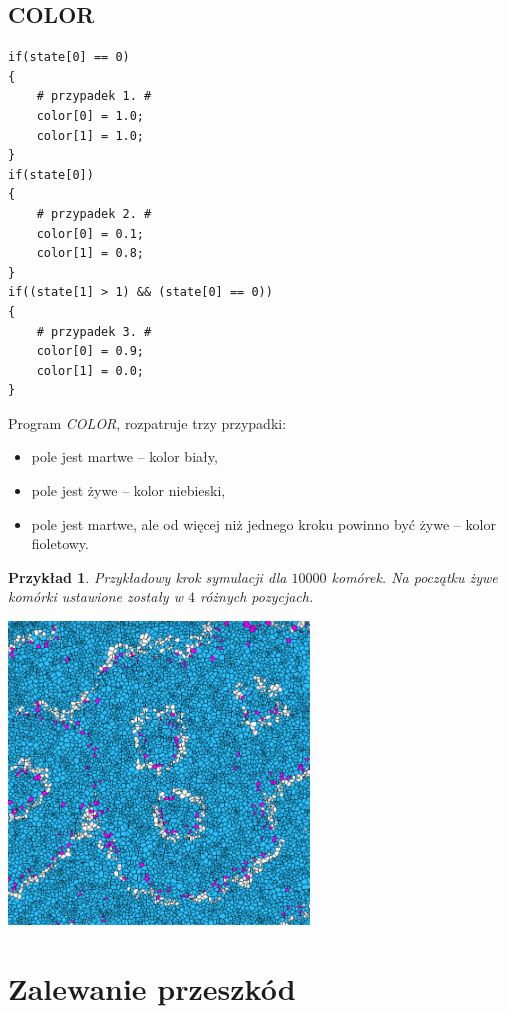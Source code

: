 \documentclass[declaration,shortabstract, inz]{iithesis}
\theoremstyle{definition} \newtheorem{definition}{Definicja}[]
\theoremstyle{plain} \newtheorem{remark}[definition]{Obserwacja}
\theoremstyle{plain} \newtheorem{theorem}[definition]{Twierdzenie}
\theoremstyle{plain} \newtheorem{example}{Przykład}[definition]
\theoremstyle{plain} \newtheorem{lemma}[definition]{Lemat}
\begin{document}
\subsection{COLOR}

\begin{center}
\begin{lstlisting}
if(state[0] == 0)
{
    # przypadek 1. #
    color[0] = 1.0;
    color[1] = 1.0;
}
if(state[0])
{
    # przypadek 2. #
    color[0] = 0.1;
    color[1] = 0.8;
}
if((state[1] > 1) && (state[0] == 0))
{
    # przypadek 3. #
    color[0] = 0.9;
    color[1] = 0.0;
}
\end{lstlisting}
\end{center}
Program \textit{COLOR}, rozpatruje trzy przypadki: 
\begin{itemize}
\item pole jest martwe -- kolor biały,
\item pole jest żywe -- kolor niebieski,
\item pole jest martwe, ale od więcej niż jednego kroku powinno być żywe -- kolor fioletowy.
\end{itemize}

\begin{example}
Przykładowy krok symulacji dla $10000$ komórek. Na początku żywe komórki ustawione zostały w $4$ różnych pozycjach.
	\begin{center}
		\includegraphics[width=0.6\textwidth]{sim1}
	\end{center}
\end{example}

\section{Zalewanie przeszkód}
\end{document}
